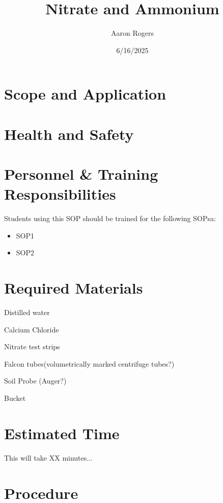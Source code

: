 \documentclass[12pt]{../SOP4_alpha}\usepackage[]{graphicx}\usepackage[]{xcolor}
\title{Nitrate and Ammonium}
\date{6/16/2025}
\author{Aaron Rogers}
\begin{document}

\maketitle

\section{Scope and Application}

\NP \blindtext

\NP \lipsum[1]

\section{Health and Safety}

\NP \lipsum[2]


\section{Personnel \& Training Responsibilities}

\NP \lipsum[1]

Students using this SOP should be trained for the following SOPsa:

\begin{itemize}
  \item SOP1
  \item SOP2
\end{itemize}


\section{Required Materials}

\NP Distilled water

\NP Calcium Chloride

\NP Nitrate test strips

\NP Falcon tubes(volumetrically marked centrifuge tubes?)

\NP Soil Probe (Auger?)

\NP Bucket

\section{Estimated Time}

\NP This will take XX minutes...

\section{Procedure}
\end{document}
